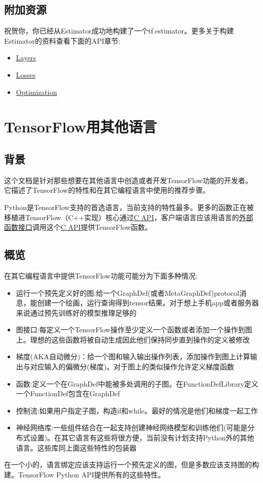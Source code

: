 \subsection{附加资源}
祝贺你，你已经从Estimator成功地构建了一个tf.estimator。更多关于构建Estimator的资料查看下面的API章节:
\begin{itemize}
\item \href{https://www.tensorflow.org/api_guides/python/contrib.layers}{Layers}
\item \href{https://www.tensorflow.org/api_guides/python/contrib.losses}{Losses}
\item \href{https://www.tensorflow.org/api_guides/python/contrib.layers#optimization}{Optimization}
\end{itemize}
\section{TensorFlow用其他语言}
\subsection{背景}
这个文档是针对那些想要在其他语言中创造或者开发TensorFlow功能的开发者。它描述了TensorFlow的特性和在其它编程语言中使用的推荐步骤。

Python是TensorFlow支持的首选语言，当前支持的特性最多。更多的函数正在被移植进TensorFlow（C++实现）核心通过\href{https://www.github.com/tensorflow/tensorflow/blob/r1.4/tensorflow/c/c_api.h}{C API}，客户端语言应该用语言的\href{https://en.wikipedia.org/wiki/Foreign_function_interface}{外部函数接口}调用这个\href{https://www.github.com/tensorflow/tensorflow/blob/r1.4/tensorflow/c/c_api.h}{C API}提供TensorFlow函数。
\subsection{概览}
在其它编程语言中提供TensorFlow功能可能分为下面多种情况:
\begin{itemize}
\item 运行一个预先定义好的图:给一个GraphDef(或者MetaGraphDef)protocol消息，能创建一个绘画，运行查询得到tensor结果。对于想上手机app或者服务器来说通过预先训练好的模型推理足够的
\item 图接口:每定义一个TensorFlow操作至少定义一个函数或者添加一个操作到图上。理想的这些函数将被自动生成因此他们保持同步直到操作的定义被修改
\item 梯度(AKA自动微分)：给一个图和输入输出操作列表，添加操作到图上计算输出与对应输入的偏微分(梯度)。对于图上的类似操作允许定义梯度函数
\item 函数:定义一个在GraphDef中能被多处调用的子图。在FunctionDefLibrary定义一个FunctionDef包含在GraphDef
\item 控制流:如果用户指定子图，构造if和while。最好的情况是他们和梯度一起工作
\item 神经网络库:一些组件结合在一起支持创建神经网络模型和训练他们(可能是分布式设置)。在其它语言有这些将很方便，当前没有计划支持Python外的其他语言。这些库同上面这些特性的包装器
\end{itemize}
在一个小的，语言绑定应该支持运行一个预先定义的图，但是多数应该支持图的构建。TensorFlow Python API提供所有的这些特性。
